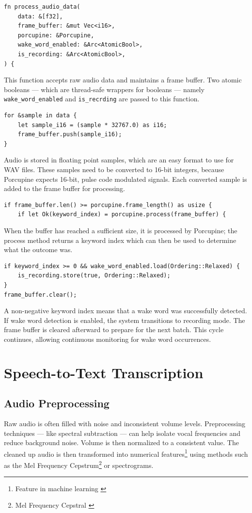 \begin{verbatim}
fn process_audio_data(
    data: &[f32],
    frame_buffer: &mut Vec<i16>,
    porcupine: &Porcupine,
    wake_word_enabled: &Arc<AtomicBool>,
    is_recording: &Arc<AtomicBool>,
) {
\end{verbatim}

This function accepts raw audio data and maintains a frame buffer.
Two atomic booleans --- which are thread-safe wrappers for booleans ---
namely \texttt{wake\_word\_enabled} and \texttt{is\_recrding} are passed to this function.

\begin{verbatim}
for &sample in data {
    let sample_i16 = (sample * 32767.0) as i16;
    frame_buffer.push(sample_i16);
}
\end{verbatim}

Audio is stored in floating point samples, which are an easy format
to use for WAV files. These samples need to be converted to 16-bit integers,
because Porcupine expects 16-bit, pulse code modulated signals.
Each converted sample is added to the frame buffer for processing.

\begin{verbatim}
if frame_buffer.len() >= porcupine.frame_length() as usize {
    if let Ok(keyword_index) = porcupine.process(frame_buffer) {
\end{verbatim}

When the buffer has reached a sufficient size, it is processed by Porcupine;
the process method returns a keyword index which can then be used to determine what the outcome was.

\begin{verbatim}
if keyword_index >= 0 && wake_word_enabled.load(Ordering::Relaxed) {
    is_recording.store(true, Ordering::Relaxed);
}
frame_buffer.clear();
\end{verbatim}

A non-negative keyword index means that a wake word was successfully detected.
If wake word detection is enabled, the system transitions to recording mode.
The frame buffer is cleared afterward to prepare for the next batch.
This cycle continues, allowing continuous monitoring for wake word occurrences.

\section{Speech-to-Text Transcription}

\subsection{Audio Preprocessing}
Raw audio is often filled with noise and inconsistent volume levels.
Preprocessing techniques --- like spectral subtraction --- can help isolate vocal frequencies and reduce background noise.
Volume is then normalized to a consistent value.
The cleaned up audio is then transformed into numerical features\footnote{Feature in machine learning \cite{feature}}
using methods such as the Mel Frequency Cepstrum\footnote{Mel Frequency Cepstral \cite{mfc}} or spectrograms.

